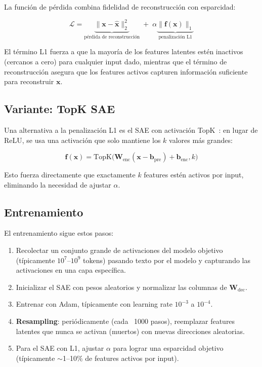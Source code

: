 \documentclass[11pt,a4paper]{report}
\theoremstyle{definition}
\begin{document}
La función de pérdida combina fidelidad de reconstrucción con esparcidad:

\[
\mathcal{L} = \underbrace{\|\mathbf{x} - \hat{\mathbf{x}}\|_2^2}_{\text{pérdida de reconstrucción}} \;+\; \alpha \underbrace{\|\mathbf{f}(\mathbf{x})\|_1}_{\text{penalización L1}}
\]

El término L1 fuerza a que la mayoría de los features latentes estén inactivos (cercanos a cero) para cualquier input dado, mientras que el término de reconstrucción asegura que los features activos capturen información suficiente para reconstruir $\mathbf{x}$.

\subsection{Variante: TopK SAE}

Una alternativa a la penalización L1 es el SAE con activación TopK~\cite{gao2024topk}: en lugar de ReLU, se usa una activación que solo mantiene los $k$ valores más grandes:

\[
\mathbf{f}(\mathbf{x}) = \text{TopK}\big(\mathbf{W}_{\text{enc}}(\mathbf{x} - \mathbf{b}_{\text{pre}}) + \mathbf{b}_{\text{enc}}, k\big)
\]

Esto fuerza directamente que exactamente $k$ features estén activos por input, eliminando la necesidad de ajustar $\alpha$.

\subsection{Entrenamiento}

El entrenamiento sigue estos pasos:

\begin{enumerate}
    \item Recolectar un conjunto grande de activaciones del modelo objetivo (típicamente $10^7$--$10^9$ tokens) pasando texto por el modelo y capturando las activaciones en una capa específica.
    \item Inicializar el SAE con pesos aleatorios y normalizar las columnas de $\mathbf{W}_{\text{dec}}$.
    \item Entrenar con Adam, típicamente con learning rate $10^{-3}$ a $10^{-4}$.
    \item \textbf{Resampling}: periódicamente (cada ~1000 pasos), reemplazar features latentes que nunca se activan (muertos) con nuevas direcciones aleatorias.
    \item Para el SAE con L1, ajustar $\alpha$ para lograr una esparcidad objetivo (típicamente $\sim$1--10\% de features activos por input).
\end{enumerate}
\end{document}
